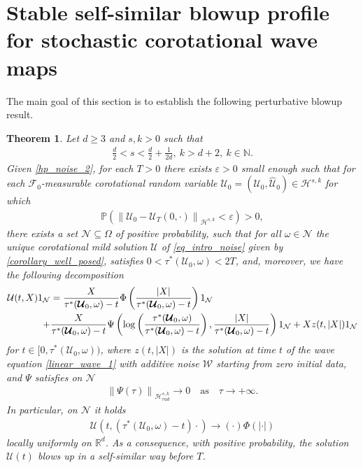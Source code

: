 \documentclass[12pt,reqno]{amsart}
\theoremstyle{plain}
\newtheorem{theorem}{Theorem}[section]
\theoremstyle{remark}
\theoremstyle{plain}
\theoremstyle{definition}
\numberwithin{equation}{section}
\numberwithin{equation}{section}
\def\N{{\mathbb N}}
\newcommand{\norm}[1]{\left\|#1\right\|}
\newcommand{\HH}{\mathcal{H}}
\newcommand{\eps}{\varepsilon}
\begin{document}
	\section{Stable self-similar blowup profile for stochastic corotational  wave maps}\label{sec_self_similar_analysis}
	\noindent The main goal of this section is to establish the following perturbative blowup result.
	\begin{theorem}\label{stability_lemma}
		Let $d\geq 3$ and $s,k>0$ such that \begin{align*}
			\frac{d}{2}<s<\frac{d}{2}+\frac{1}{2d},\ k>d+2,\ k\in \N.\end{align*}
		Given \autoref{hp_noise_2}, for each $T>0$ there exists $\eps>0$ small enough such that for each $\mathcal{F}_0$-measurable corotational random variable $\boldsymbol{\mathcal{U}}_0=(\mathcal{U}_0,\hat{\mathcal{U}}_0)\in \HH^{s,k}$ for which
		\begin{align*}
			\mathbb{P}\left(\norm{\boldsymbol{\mathcal{U}}_0-\boldsymbol{\mathcal{U}}_{T}(0,\cdot)}_{\HH^{s,k}}<\eps\right)>0,   
		\end{align*} there exists a set $\mathcal{N} \subseteq \Omega$ of positive probability, such that for all $\omega \in \mathcal{N}$ the unique corotational mild solution $\mathcal{U}$ of \eqref{eq_intro_noise} given by \autoref{corollary_well_posed}, satisfies $0 < \tau^{*}(\boldsymbol{\mathcal{U}}_0,\omega) < 2T$, and, moreover, we have the following decomposition
		\begin{align}\label{representation_formula_calU}
			\mathcal{U}(t,X)1_{\mathcal{N}}&=\frac{X}{\tau^{*}(\boldsymbol{\mathcal{U}}_0,\omega)-t}\Phi\left(\frac{\lvert X\rvert }{\tau^{*}(\boldsymbol{\mathcal{U}}_0,\omega)-t}\right)1_{\mathcal{N}}\notag \\ +&\frac{X}{\tau^{*}(\boldsymbol{\mathcal{U}}_0,\omega)-t}\Psi\left(\log\left(\frac{\tau^{*}(\boldsymbol{\mathcal{U}}_0,\omega)}{\tau^{*}(\boldsymbol{\mathcal{U}}_0,\omega)-t}\right),\frac{\lvert X\rvert}{\tau^{*}(\boldsymbol{\mathcal{U}}_0,\omega)-t}\right)1_{\mathcal{N}} +Xz(t,\lvert X\rvert) 1_{\mathcal{N}}
		\end{align}
		for  $t\in [0,\tau^{*}(\boldsymbol{\mathcal{U}}_0,\omega))$, where $z(t,|X|) $ is the solution at time $t$ of the wave equation \eqref{linear_wave_1} with additive noise $\mathcal{W}$ starting from zero initial data, and $\Psi$ satisfies on $\mathcal{N}$
		\begin{align*}
			\norm{\Psi(\tau)}_{\HH_{rad}^{s,k}}\rightarrow 0\quad \text{as} \quad \tau\rightarrow+\infty. 
		\end{align*}
		In particular, on $\mathcal{N}$ it holds 
		\begin{align*}
			\mathcal{U}(t,(\tau^{*}(\boldsymbol{\mathcal{U}}_0,\omega)-t)\cdot) \rightarrow (\cdot)\Phi(|\cdot|)
		\end{align*}
		locally uniformly on $\mathbb{R}^d$. As a consequence, with positive probability, the solution $\mathcal{U}(t)$ blows up in a self-similar way before $T$.  
		
		
		
	\end{theorem}
\end{document}
